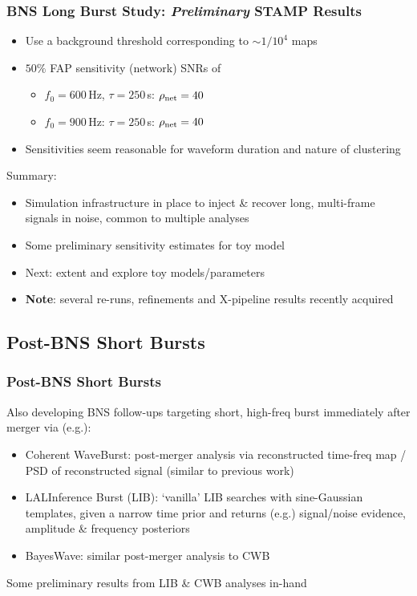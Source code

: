 \documentclass{beamer}
\begin{document}
\begin{frame}
    \frametitle{BNS Long Burst Study: \emph{Preliminary} STAMP Results}
    \begin{itemize}
        \item Use a background threshold corresponding to $\sim1/10^4$ maps
        \item $50\%$ FAP sensitivity (network) SNRs of
            \begin{itemize}
                \item $f_0=600$\,Hz, $\tau=250$\,s: $\rho_{\rm{net}}=40$
                \item $f_0=900$\,Hz: $\tau=250$\,s: $\rho_{\rm{net}}=40$
            \end{itemize}
        \item Sensitivities seem reasonable for waveform duration and nature of
            clustering
    \end{itemize}
    Summary:
    \begin{itemize}
        \item Simulation infrastructure in place to inject \& recover long,
            multi-frame signals in noise, common to multiple
            analyses
        \item Some preliminary sensitivity estimates for toy model
        \item Next: extent and explore toy models/parameters
        \item {\bf Note}: several re-runs, refinements and X-pipeline results
            recently acquired 
    \end{itemize}

\end{frame}

\subsection{Post-BNS Short Bursts}

\begin{frame}
    \frametitle{Post-BNS Short Bursts}
    Also developing BNS follow-ups targeting short, high-freq burst
    immediately after merger via (e.g.):
    \begin{itemize}
        \item Coherent WaveBurst: post-merger analysis via reconstructed
            time-freq map / PSD of reconstructed signal (similar to previous work)
        \item LALInference Burst (LIB): `vanilla' LIB searches with sine-Gaussian
            templates, given a narrow time prior and returns (e.g.) signal/noise
            evidence, amplitude \& frequency posteriors
        \item BayesWave: similar post-merger analysis to CWB
    \end{itemize}
    Some preliminary results from LIB \& CWB analyses in-hand
\end{frame}
\end{document}
